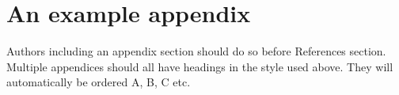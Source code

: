 \documentclass[5p,times,procedia]{elsarticle}
\begin{document}
\appendix
\section{An example appendix}
Authors including an appendix section should do so before References section. Multiple appendices should all have headings in the style used above. They will automatically be ordered A, B, C etc.

















\clearpage\onecolumn

\normalMode
\end{document}

